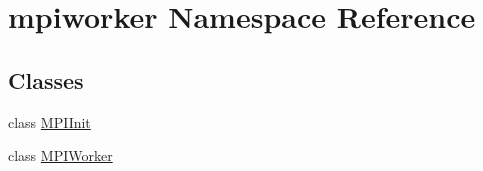\hypertarget{namespacempiworker}{\section{mpiworker Namespace Reference}
\label{namespacempiworker}
}
\subsection*{Classes}
\begin{DoxyCompactItemize}
\item 
class \hyperlink{classmpiworker_1_1MPIInit}{M\-P\-I\-Init}
\item 
class \hyperlink{classmpiworker_1_1MPIWorker}{M\-P\-I\-Worker}
\end{DoxyCompactItemize}
